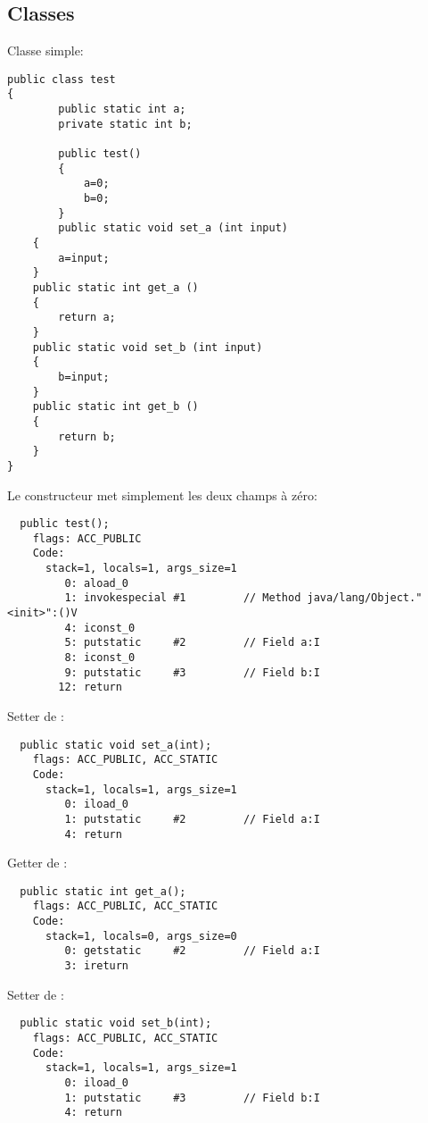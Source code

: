 \subsection{Classes}

Classe simple:

\begin{lstlisting}[caption=test.java,style=customjava]
public class test
{
        public static int a;
        private static int b;

        public test()
        {
            a=0;
            b=0;
        }
        public static void set_a (int input)
	{
		a=input;
	}
	public static int get_a ()
	{
		return a;
	}
	public static void set_b (int input)
	{
		b=input;
	}
	public static int get_b ()
	{
		return b;
	}
}
\end{lstlisting}

Le constructeur met simplement les deux champs à zéro:


\begin{lstlisting}
  public test();
    flags: ACC_PUBLIC
    Code:
      stack=1, locals=1, args_size=1
         0: aload_0
         1: invokespecial #1         // Method java/lang/Object."<init>":()V
         4: iconst_0
         5: putstatic     #2         // Field a:I
         8: iconst_0
         9: putstatic     #3         // Field b:I
        12: return
\end{lstlisting}

Setter de :

\begin{lstlisting}
  public static void set_a(int);
    flags: ACC_PUBLIC, ACC_STATIC
    Code:
      stack=1, locals=1, args_size=1
         0: iload_0
         1: putstatic     #2         // Field a:I
         4: return
\end{lstlisting}

Getter de :

\begin{lstlisting}
  public static int get_a();
    flags: ACC_PUBLIC, ACC_STATIC
    Code:
      stack=1, locals=0, args_size=0
         0: getstatic     #2         // Field a:I
         3: ireturn
\end{lstlisting}

Setter de :

\begin{lstlisting}
  public static void set_b(int);
    flags: ACC_PUBLIC, ACC_STATIC
    Code:
      stack=1, locals=1, args_size=1
         0: iload_0
         1: putstatic     #3         // Field b:I
         4: return
\end{lstlisting}

